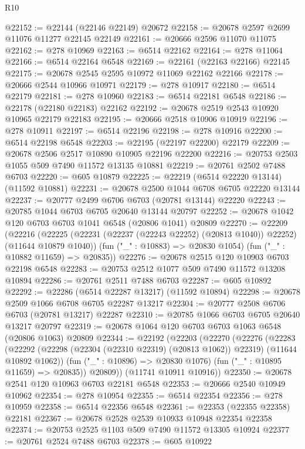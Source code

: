 \begin{lexlean}{R10}
\begin{coremodule}
@22152 := @22144 (@22146 @22149) @20672
@22158 := @20678 @2597 @2699 @11076 @11277 @22145 @22149
@22161 := @20666 @2596 @11070 @11075
@22162 := @278 @10969
@22163 := @6514 @22162
@22164 := @278 @11064
@22166 := @6514 @22164 @6548
@22169 := @22161 (@22163 @22166) @22145
@22175 := @20678 @2545 @2595 @10972 @11069 @22162 @22166
@22178 := @20666 @2544 @10966 @10971
@22179 := @278 @10917
@22180 := @6514 @22179
@22181 := @278 @10960
@22183 := @6514 @22181 @6548
@22186 := @22178 (@22180 @22183) @22162
@22192 := @20678 @2519 @2543 @10920 @10965 @22179 @22183
@22195 := @20666 @2518 @10906 @10919
@22196 := @278 @10911
@22197 := @6514 @22196
@22198 := @278 @10916
@22200 := @6514 @22198 @6548
@22203 := @22195 (@22197 @22200) @22179
@22209 := @20678 @2506 @2517 @10890 @10905 @22196 @22200
@22216 := @20753 @2503 @1055 @509 @7490 @11572 @13135 @10881
@22219 := @20761 @2502 @7488 @6703
@22220 := @605 @10879
@22225 := @22219 (@6514 @22220 @13144) (@11592 @10881)
@22231 := @20678 @2500 @1044 @6708 @6705 @22220 @13144
@22237 := @20777 @2499 @6706 @6703 (@20781 @13144) @22220
@22243 := @20785 @1044 @6703 @6705 @20640 @13144 @20797
@22252 := @20678 @1042 @120 @6703 @6703 @1041 @6548 (@20806 @1041) @20809
@22270 := @22209
    (@22216
      (@22225 (@22231 (@22237 (@22243 @22252) (@20813 @1040)) @22252) (@11644 @10879 @1040))
      (fun ("_" : @10883) => @20830 @1054)
      (fun ("_" : @10882 @11659) => @20835))
@22276 := @20678 @2515 @120 @10903 @6703 @22198 @6548
@22283 := @20753 @2512 @1077 @509 @7490 @11572 @13208 @10894
@22286 := @20761 @2511 @7488 @6703
@22287 := @605 @10892
@22292 := @22286 (@6514 @22287 @13217) (@11592 @10894)
@22298 := @20678 @2509 @1066 @6708 @6705 @22287 @13217
@22304 := @20777 @2508 @6706 @6703 (@20781 @13217) @22287
@22310 := @20785 @1066 @6703 @6705 @20640 @13217 @20797
@22319 := @20678 @1064 @120 @6703 @6703 @1063 @6548 (@20806 @1063) @20809
@22344 := @22192
    (@22203
      (@22270
        (@22276
          (@22283
            (@22292 (@22298 (@22304 (@22310 @22319) (@20813 @1062)) @22319) (@11644 @10892 @1062))
            (fun ("_" : @10896) => @20830 @1076)
            (fun ("_" : @10895 @11659) => @20835))
          @20809))
      (@11741 @10911 @10916))
@22350 := @20678 @2541 @120 @10963 @6703 @22181 @6548
@22353 := @20666 @2540 @10949 @10962
@22354 := @278 @10954
@22355 := @6514 @22354
@22356 := @278 @10959
@22358 := @6514 @22356 @6548
@22361 := @22353 (@22355 @22358) @22181
@22367 := @20678 @2528 @2539 @10933 @10948 @22354 @22358
@22374 := @20753 @2525 @1103 @509 @7490 @11572 @13305 @10924
@22377 := @20761 @2524 @7488 @6703
@22378 := @605 @10922

\end{coremodule}
\end{lexlean}
